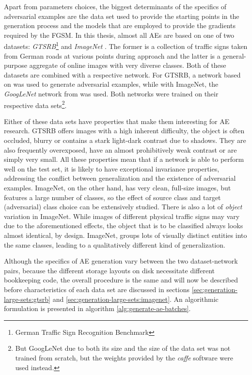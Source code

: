 \documentclass[11pt, a4paper]{article}
\begin{document}
Apart from parameters choices, the biggest determinants of the specifics of adversarial examples are the data set used to provide the starting points in the generation process and the models that are employed to provide the gradients required by the FGSM. In this thesis, almost all AEs are based on one of two datasets: \emph{GTSRB}\footnote{German Traffic Sign Recognition Benchmark} \cite{gtsrb-description} and \emph{ImageNet} \cite{imagenet-large-scale-hierarchical-image-database}. The former is a collection of traffic signs taken from German roads at various points during approach and the latter is a general-purpose aggregate of online images with very diverse classes. Both of these datasets are combined with a respective network. For GTSRB, a network based on \cite{multi-column-neural-network-gtsrb} was used to generate adversarial examples, while with ImageNet, the \emph{GoogLeNet} network from \cite{going-deeper-with-convolutions} was used. Both networks were trained on their respective data sets\footnote{But GoogLeNet due to both its size and the size of the data set was not trained from scratch, but the weights provided by the \emph{caffe} software were used instead.}.

Either of these data sets have properties that make them interesting for AE research. GTSRB offers images with a high inherent difficulty, the object is often occluded, blurry or contains a stark light-dark contrast due to shadows. They are also frequently overexposed, have an almost prohibitively weak contrast or are simply very small. All these properties mean that if a network is able to perform well on the test set, it is likely to have exceptional invariance properties, addressing the conflict between generalization and the existence of adversarial examples. ImageNet, on the other hand, has very clean, full-size images, but features a large number of classes, so the effect of source class and target (adversarial) class choice can be extensively studied. There is also a lot of \emph{object} variation in ImageNet. While images of different physical traffic signs may vary due to the aforementioned effects, the object that is to be classified always looks almost identical, by design. ImageNet, groups lots of visually distinct entities into the same classes, leading to a qualitatively different kind of generalization.

Although the specifics of AE generation vary between the two dataset-network pairs, because the different storage layouts on disk necessitate different bookkeeping code, the overall procedure is the same and will now be described before characteristics of each data set are discussed in sections \ref{sec:generation-large-sets:gtsrb} and \ref{sec:generation-large-sets:imagenet}. An algorithmic formulation is presented in algorithm \ref{alg:generate-ae-batches}.
\end{document}
